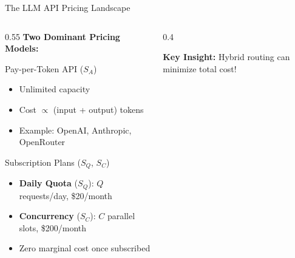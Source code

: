 \documentclass[aspectratio=169,10pt]{beamer}
\begin{document}
\begin{frame}{The LLM API Pricing Landscape}
\begin{columns}[T]
\begin{column}{0.55\textwidth}
\textbf{Two Dominant Pricing Models:}
\vspace{0.3cm}

\begin{block}{Pay-per-Token API ($S_A$)}
\begin{itemize}
    \item Unlimited capacity
    \item Cost $\propto$ (input + output) tokens
    \item Example: OpenAI, Anthropic, OpenRouter
\end{itemize}
\end{block}

\begin{block}{Subscription Plans ($S_Q$, $S_C$)}
\begin{itemize}
    \item \textbf{Daily Quota} ($S_Q$): $Q$ requests/day, \$20/month
    \item \textbf{Concurrency} ($S_C$): $C$ parallel slots, \$200/month
    \item Zero marginal cost once subscribed
\end{itemize}
\end{block}
\end{column}

\begin{column}{0.4\textwidth}
\centering
{}

\vspace{0.5cm}
\textcolor{icmlblue}{\textbf{Key Insight:}} Hybrid routing can minimize total cost!
\end{column}
\end{columns}
\end{frame}
\end{document}
